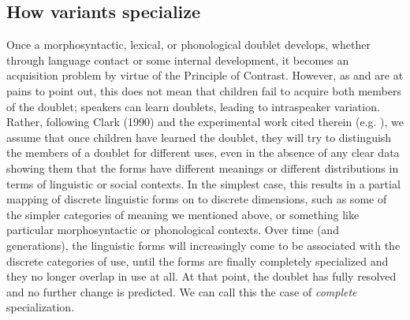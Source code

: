  \subsection{How variants specialize}
 \label{options}
Once a morphosyntactic, lexical, or phonological doublet develops, whether through language contact or some internal development, it becomes an acquisition problem by virtue of the Principle of Contrast. 
However, as \citet{kroch1994} and \citet{yang2000,yang2002} are at pains to point out, this does not mean that children fail to acquire both members of the doublet; speakers can learn doublets, leading to intraspeaker variation.
Rather, following Clark (1990) and the experimental work cited therein (e.g. \citealt{markmanwachtel1988}), we assume that once children have learned the doublet, they will try to distinguish the members of a doublet for different uses, even in the absence of any clear data showing them that the forms have different meanings or different distributions in terms of linguistic or social contexts. 
In the simplest case, this results in a partial mapping of discrete linguistic forms on to discrete dimensions, such as some of the simpler categories of meaning we mentioned above, or something like particular morphosyntactic or phonological contexts. 
Over time (and generations), the linguistic forms will increasingly come to be associated with the discrete categories of use, until the forms are finally completely specialized and they no longer overlap in use at all. At that point, the doublet has fully resolved and no further change is predicted.
We can call this the case of \textsl{complete} specialization.

